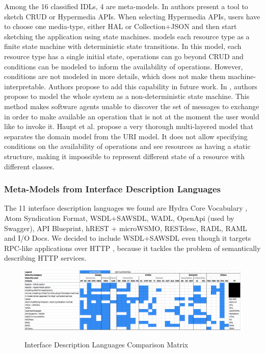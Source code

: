 Among the 16 classified IDLs, 4 are meta-models. In \cite{Rapido} authors present a tool to sketch CRUD or Hypermedia APIs. When selecting Hypermedia APIs, users have to choose one media-type, either HAL or Collection+JSON and then start sketching the application using state machines. \cite{Schreier:2011:MRA:1967428.1967434} models each resource type as a finite state machine with deterministic state transitions. In this model, each resource type has a single initial state, operations can go beyond CRUD and conditions can be modeled to inform the availability of operations. However, conditions are not modeled in more details, which does not make them machine-interpretable. Authors propose to add this capability in future work. In \cite{10.1007/978-3-642-22233-7_24}, authors propose to model the whole system as a non-deterministic state machine. This method makes software agents unable to discover the set of messages to exchange in order to make available an operation that is not at the moment the user would like to invoke it. Haupt et al. \cite{10.1109/ICWS.2014.30} propose a very thorough multi-layered model that separates the domain model from the URI model. It does not allow specifying conditions on the availability of operations and see resources as having a static structure, making it impossible to represent different state of a resource with different classes. 

\subsubsection{Meta-Models from Interface Description Languages}

The 11 interface description languages we found are Hydra Core Vocabulary \cite{Lanthaler:2013:CGW:2487788.2487799}, Atom Syndication Format\cite{AtomSF}, WSDL+SAWSDL, WADL, OpenApi (used by Swagger), API Blueprint, hREST + microWSMO, RESTdesc, RADL, RAML and I/O Docs. We decided to include WSDL+SAWSDL even though it targets RPC-like applications over HTTP \cite{john2012framework}, because it tackles the problem of semantically describing HTTP services.

\begin{figure}[t]
\caption{Interface Description Languages Comparison Matrix}
\includegraphics[width=1\textwidth]{figures/IDL.png}
\label{idl-matrix}
\end{figure}

